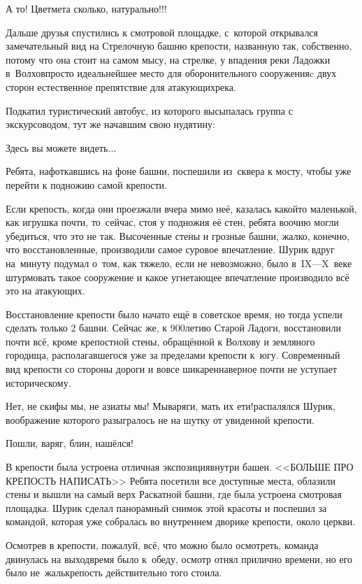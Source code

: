 \diagdash А то! Цветмета сколько, натурально!!!

Дальше друзья спустились к смотровой площадке, с~которой открывался замечательный вид на Стрелочную башню крепости, названную так, собственно, потому что она стоит на самом мысу, на стрелке, у впадения реки Ладожки в~Волхов\mdash просто идеальнейшее место для оборонительного сооружения\mdash c двух сторон естественное препятствие для атакующих\mdash река.

Подкатил туристический автобус, из которого высыпалась группа с экскурсоводом, тут же начавшим свою нудятину:

\diagdash Здесь вы можете видеть$\ldots$

Ребята, нафоткавшись на фоне башни, поспешили из~сквера к мосту, чтобы уже перейти к подножию самой крепости.

Если крепость, когда они проезжали вчера мимо неё, казалась какой\sdash то маленькой, как игрушка почти, то~сейчас, стоя у подножия её стен, ребята воочию могли убедиться, что это не так. Высоченные стены и грозные башни, жалко, конечно, что восстановленные, производили самое суровое впечатление. Шурик вдруг на~минуту подумал о~том, как тяжело, если не невозможно, было в~IX\thinspace\nobreakdash---\thinspace X~веке штурмовать такое сооружение и какое угнетающее впечатление производило всё это на атакующих.

Восстановление крепости было начато ещё в советское время, но тогда успели сделать только 2 башни. Сейчас же, к 900\sdash летию Старой Ладоги, восстановили почти всё, кроме крепостной стены, обращённой к Волхову и земляного городища, располагавшегося уже за пределами крепости к~югу. Современный вид крепости со стороны дороги и вовсе шикарен\mdash наверное почти не уступает историческому. 

\diagdash Нет, не скифы мы, не азиаты мы! Мы\mdash варяги, мать их ети!\mdash распалялся Шурик, воображение которого разыгралось не на шутку от увиденной крепости.

\diagdash Пошли, варяг, блин, нашёлся!

В крепости была устроена отличная экспозиция\mdash внутри башен. <<БОЛЬШЕ ПРО КРЕПОСТЬ НАПИСАТЬ>> Ребята посетили все доступные места, облазили стены и вышли на самый верх Раскатной башни, где была устроена смотровая площадка. Шурик сделал панорамный снимок этой красоты и поспешил за командой, которая уже собралась во внутреннем дворике крепости, около церкви.

Осмотрев в крепости, пожалуй, всё, что можно было осмотреть, команда двинулась на выход\mdash время было к~обеду, осмотр отнял прилично времени, но его было не~жаль\mdash крепость действительно того стоила. 

